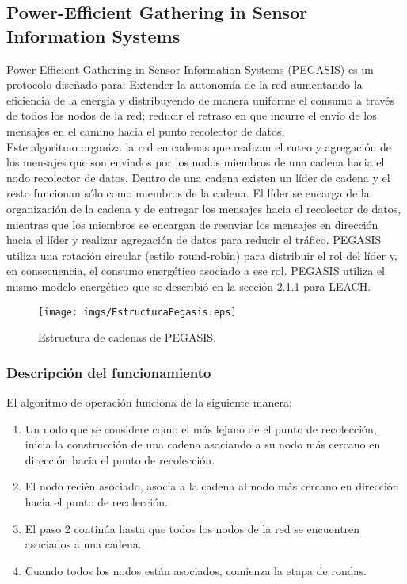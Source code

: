 \subsection{Power-Efficient Gathering in Sensor Information Systems}
Power-Efficient Gathering in Sensor Information Systems (PEGASIS) es un protocolo diseñado para: Extender la autonomía de la red aumentando la eficiencia de la energía y distribuyendo de manera uniforme el consumo a través de todos los nodos de la red; reducir el retraso en que incurre el envío de los mensajes en el camino hacia el punto recolector de datos.\\

Este algoritmo organiza la red en cadenas que realizan el ruteo y agregación de los mensajes que son enviados por los nodos miembros de una cadena hacia el nodo recolector de datos. Dentro de una cadena existen un líder de cadena y el resto funcionan sólo como miembros de la cadena. El líder se encarga de la organización de la cadena y de entregar los mensajes hacia el recolector de datos, mientras que los miembros se encargan de reenviar los mensajes en dirección hacia el líder y realizar agregación de datos para reducir el tráfico. PEGASIS utiliza una rotación circular (estilo round-robin) para distribuir el rol del líder y, en consecuencia, el consumo energético asociado a ese rol. PEGASIS utiliza el mismo modelo energético que se describió en la sección 2.1.1 para LEACH.

\begin{center}
\begin{figure}[h!]
\centering
 \texttt{[image: imgs/EstructuraPegasis.eps]} 
\caption{Estructura de cadenas de PEGASIS.}
\end{figure}
\end{center}

\subsubsection{Descripción del funcionamiento}
El algoritmo de operación funciona de la siguiente manera:
\begin{enumerate}
 \item Un nodo que se considere como el más lejano de el punto de recolección, inicia la construcción de una cadena asociando a su nodo más cercano en dirección hacia el punto de recolección.
 \item El nodo recién asociado, asocia a la cadena al nodo más cercano en dirección hacia el punto de recolección.
 \item El paso 2 continúa hasta que todos los nodos de la red se encuentren asociados a una cadena.
 \item Cuando todos los nodos están asociados, comienza la etapa de rondas. 
\end{enumerate}


